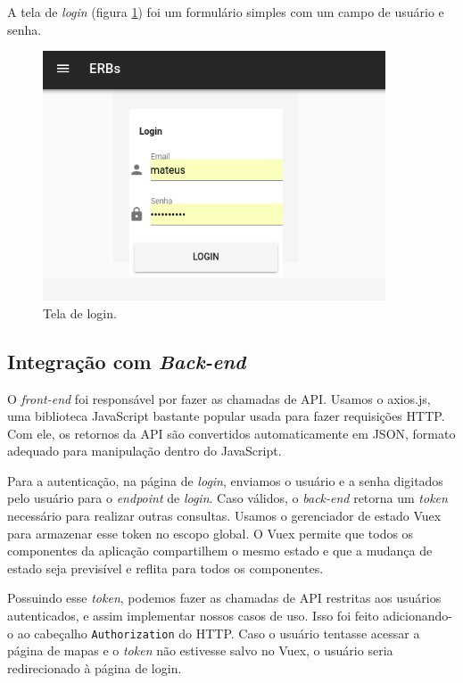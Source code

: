 \documentclass[]{politex}
\begin{document}
A tela de \textit{login} (figura \ref{fig:tela_login}) foi um formulário simples com um campo de usuário e senha.

\begin{figure}[H]
    \centering
    \includegraphics[width=4in]{imagens/tela-login}
    \caption{Tela de login.}
    \label{fig:tela_login}
\end{figure}
\subsection{Integração com \textit{Back-end}}

O \textit{front-end} foi responsável por fazer as chamadas de API.
Usamos o axios.js, uma biblioteca JavaScript bastante popular usada para fazer
requisições HTTP. Com ele, os retornos da API são convertidos
automaticamente em JSON, formato adequado para manipulação dentro do JavaScript.

Para a autenticação, na página de \textit{login}, enviamos o usuário e a senha digitados
pelo usuário para o \textit{endpoint} de \textit{login}. Caso válidos, o \textit{back-end} retorna um
\textit{token} necessário para realizar outras consultas. Usamos o gerenciador de estado Vuex
para armazenar esse token no escopo global. O Vuex permite que todos os
componentes da aplicação compartilhem o mesmo estado e que a mudança de estado
seja previsível e reflita para todos os componentes.

Possuindo esse \textit{token}, podemos fazer as chamadas de API restritas aos usuários
autenticados, e assim implementar nossos casos de uso. Isso foi feito adicionando-o
ao cabeçalho \texttt{Authorization} do HTTP. Caso o usuário tentasse acessar a
página de mapas e o \textit{token} não estivesse salvo no Vuex, o usuário seria
redirecionado à página de login.
\end{document}
